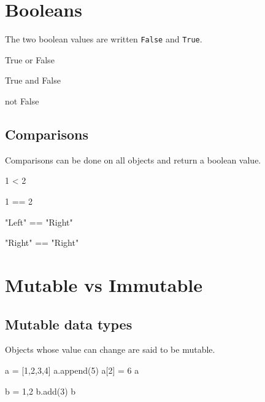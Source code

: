 \documentclass[aspectratio=1610,slidestop]{beamer}
\begin{document}
\section{Booleans}
\makeTableOfContentsSection

\begin{pframe}
The two boolean values are written \texttt{False} and
\texttt{True}.
\begin{pyconsole}
True or False

True and False

not False
\end{pyconsole}
\end{pframe}


\subsection{Comparisons}
\begin{pframe}
  Comparisons can be done on all objects and return a boolean value.
\begin{pyconsole}
1 < 2

1 == 2

"Left" == "Right"

"Right" == "Right"
\end{pyconsole}
\end{pframe}


\section{Mutable vs Immutable}
\makeTableOfContentsSection

\begin{pframe}
 \begin{center}
   
 \end{center}
\end{pframe}

\subsection{Mutable data types}
\begin{pframe}
Objects whose value can change are said to be mutable.

\begin{pyconsole}
a = [1,2,3,4]
a.append(5)
a[2] = 6
a

b = {1,2}
b.add(3)
b
\end{pyconsole}
\end{pframe}
\end{document}

